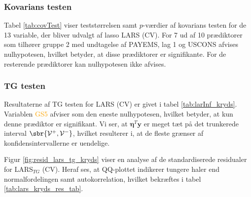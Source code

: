 \subsubsection{Kovarians testen}
Tabel \ref{tab:covTest} viser teststørrelsen samt $p$-værdier af kovarians testen for de 13 variable, der bliver udvalgt af lasso LARS (CV). 
For 7 ud af 10 prædiktorer som tilhører gruppe 2 med undtagelse af \textcolor{blue3}{PAYEMS}, \textcolor{blue3}{lag 1} og \textcolor{blue3}{USCONS} afvises nulhypotesen, hvilket betyder, at disse prædiktorer er signifikante.
For de resterende prædiktorer kan nulhypotesen ikke afvises.
\newpage


\subsubsection{TG testen}
Resultaterne af TG testen for LARS (CV) er givet i tabel \ref{tab:larInf_kryds}.
Variablen  \textcolor{orange}{GS5} afviser som den eneste nulhypotesen, hvilket betyder, at kun denne prædiktor er signifikant.
Vi ser, at $\boldsymbol{\eta}^T \textbf{y}$ er meget tæt på det trunkerede interval \(\sbr{\mathcal{V}^+, \mathcal{V}^-}\), hvilket resulterer i, at de fleste grænser af konfidensintervallerne er uendelige. 



Figur \ref{fig:resid_lars_tg_kryds} viser en analyse af de standardiserede residualer for LARS$_{TG}$ (CV). 
Heraf ses, at QQ-plottet indikerer tungere haler end normalfordelingen samt autokorrelation, hvilket bekræftes i tabel \ref{tab:lars_kryds_res_tab}. 





